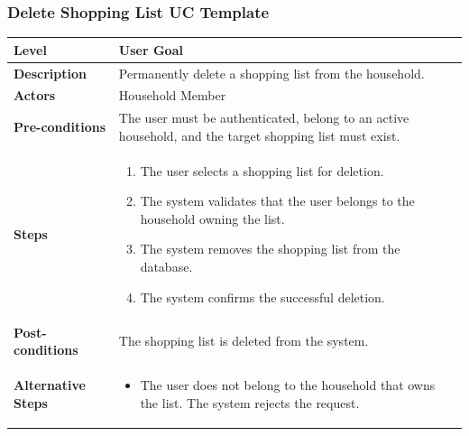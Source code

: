 \subsubsection{Delete Shopping List UC Template}
\begin{longtable}{|p{3.5cm}|p{10.3cm}|}
\hline
\rowcolor{UCRow} \textbf{Level} & User Goal \\ \hline
\textbf{Description} & Permanently delete a shopping list from the household. \\ \hline
\rowcolor{UCRow} \textbf{Actors} & Household Member \\ \hline
\textbf{Pre-conditions} & The user must be authenticated, belong to an active household, and the target shopping list must exist. \\ \hline
\rowcolor{UCRow} \textbf{Steps} &
\begin{enumerate}[nosep, leftmargin=*]
    \item The user selects a shopping list for deletion.
    \item The system validates that the user belongs to the household owning the list.
    \item The system removes the shopping list from the database.
    \item The system confirms the successful deletion.
\end{enumerate} \\ \hline
\textbf{Post-conditions} & The shopping list is deleted from the system. \\ \hline
\rowcolor{UCRow} \textbf{Alternative Steps} &
\begin{itemize}[nosep, leftmargin=2.5em]
    \item[\textbf{A1.}] The user does not belong to the household that owns the list. The system rejects the request.
\end{itemize} \\ \hline
\end{longtable}